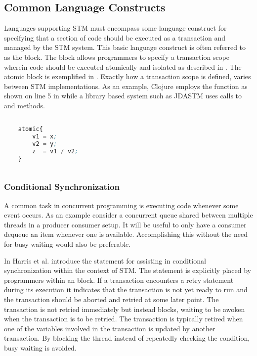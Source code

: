 \subsection{Common Language Constructs}
\label{sec:stm_common_constructs}
Languages supporting \ac{STM} must encompass some language construct for specifying that a section of code should be executed as a transaction and managed by the \ac{STM} system. This basic language construct is often referred to as the  block\cite[p. 49]{harris2005composable}\cite[p. 3]{harris2003language}. The  block allows programmers to specify a transaction scope wherein code should be executed atomically and isolated as described in . The atomic block is exemplified in . Exactly how a transaction scope is defined, varies between \ac{STM} implementations. As an example, Clojure employs the  function as shown on line 5 in  while a library based system such as JDASTM\cite{ramadan2009committing} uses calls to  and  methods.

\begin{lstlisting}[label=lst:stm_atomic_block,
  caption={The atomic block},
  language=Lisp,  
  showspaces=false,
  showtabs=false,
  breaklines=true,
  showstringspaces=false,
  breakatwhitespace=true,
  commentstyle=\color{greencomments},
  keywordstyle=\color{bluekeywords},
  stringstyle=\color{redstrings},
  morekeywords={atomic}]  % Start your code-block

	atomic{
		v1 = x;
		v2 = y;
		z  = v1 / v2;	
	}
       
\end{lstlisting}

\subsubsection{Conditional Synchronization}
\label{subsec:stm_conditional_synchronization}
A common task in concurrent programming is executing code whenever some event occurs. As an example consider a concurrent queue shared between multiple threads in a producer consumer setup. It will be useful to only have a consumer dequeue an item whenever one is available. Accomplishing this without the need for busy waiting would also be preferable.

In \cite{harris2005composable} Harris et al. introduce the  statement for assisting in conditional synchronization within the context of \ac{STM}. The  statement is explicitly placed by programmers within an  block. If a transaction encounters a retry statement during its execution it indicates that the transaction is not yet ready to run and the transaction should be aborted and retried at some later point\cite[p. 73]{harris2010transactional}. The transaction is not retried immediately but instead blocks, waiting to be awoken when the transaction is to be retried. The transaction is typically retired when one of the variables involved in the transaction is updated by another transaction\cite[p. 51]{harris2005composable}. By blocking the thread instead of repeatedly checking the condition, busy waiting is avoided.

